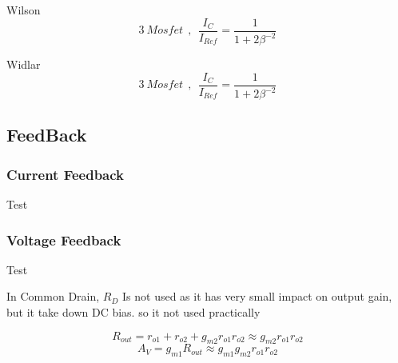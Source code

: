 Wilson
$$ 3~Mosfet ~~ , ~~ \frac{I_C}{I_{Ref}} = \frac{1}{1 + 2 \beta ^ {-2}} $$
\par
Widlar
$$ 3~Mosfet ~~ , ~~ \frac{I_C}{I_{Ref}} = \frac{1}{1 + 2 \beta ^ {-2}} $$
\par
\subsection{FeedBack}
\subsubsection{Current Feedback}
Test
\subsubsection{Voltage Feedback}
Test
\par
\setlength{\parindent}{0.5cm} %
In Common Drain, $R_D$ Is not used as it has very small impact on output gain, but it take down DC bias. so it not used practically
\lipsum[1-4]
\setlength{\parindent}{0.0cm} 
\begin{minipage}[b]{.5\textwidth}
$$ R_{out} = r_{o1} + r_{o2} + g_{m2} r_{o1} r_{o2} \approx g_{m2} r_{o1} r_{o2} $$
$$ A_V = g_{m1} R_{out} \approx g_{m1} g_{m2} r_{o1} r_{o2}$$
\par ~\\
\centering

\end{minipage}%
\noindent
\setlength{\parindent}{0.0cm} 
\hspace*{-\parindent}%
\begin{minipage}[b]{.5\textwidth}
\raggedleft

\end{minipage}%
